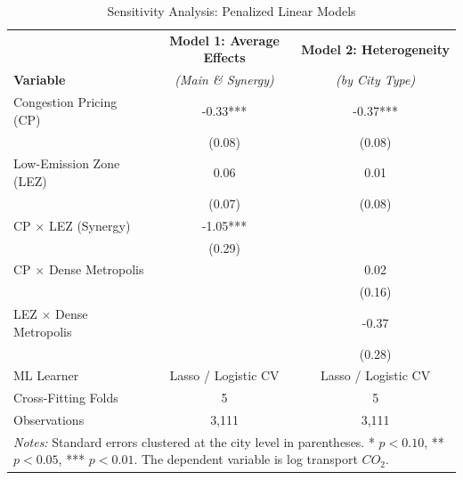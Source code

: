 \begin{table}[htbp]
\centering
\caption{Sensitivity Analysis: Penalized Linear Models}
\label{tab:sens_results}
\begin{tabular}{lcc}
\hline\hline
 & \textbf{Model 1: Average Effects} & \textbf{Model 2: Heterogeneity} \\
\textbf{Variable} & \textit{(Main \& Synergy)} & \textit{(by City Type)} \\
\hline
Congestion Pricing (CP) & -0.33*** & -0.37*** \\
 & (0.08) & (0.08) \\[0.4em]
Low-Emission Zone (LEZ) & 0.06 & 0.01 \\
 & (0.07) & (0.08) \\[0.4em]
CP $\times$ LEZ (Synergy) & -1.05*** &  \\
 & (0.29) &  \\[0.4em]
CP $\times$ Dense Metropolis &  & 0.02 \\
 &  & (0.16) \\[0.4em]
LEZ $\times$ Dense Metropolis &  & -0.37 \\
 &  & (0.28) \\[0.4em]
\hline
ML Learner & Lasso / Logistic CV & Lasso / Logistic CV \\
Cross-Fitting Folds & 5 & 5 \\
Observations & 3,111 & 3,111 \\
\hline\hline
\multicolumn{3}{p{12.5cm}}{\footnotesize \textit{Notes:} Standard errors clustered at the city level in parentheses. * $p<0.10$, ** $p<0.05$, *** $p<0.01$. The dependent variable is log transport $CO_2$.}
\end{tabular}
\end{table}
